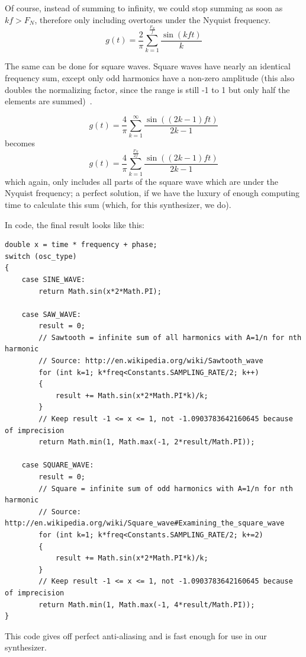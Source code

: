 \documentclass[11pt,a4paper]{article}
\begin{document}
Of course, instead of summing to infinity, we could stop summing as soon as \(kf > F_N\), therefore only including overtones under the Nyquist frequency.
\begin{equation}
g(t) = \frac{2}{\pi}\sum\limits_{k=1}^\frac{F_N}{f}{\frac{\sin(kft)}{k}}
\end{equation}

The same can be done for square waves. Square waves have nearly an identical frequency sum, except only odd harmonics have a non-zero amplitude (this also doubles the normalizing factor, since the range is still -1 to 1 but only half the elements are summed)~\cite{WolframSquare}.

\begin{equation}
g(t) = \frac{4}{\pi}\sum\limits_{k=1}^\infty{\frac{\sin((2k-1)ft)}{2k-1}}
\end{equation}
becomes
\begin{equation}
g(t) = \frac{4}{\pi}\sum\limits_{k=1}^\frac{F_N}{2f}{\frac{\sin((2k-1)ft)}{2k-1}}
\end{equation}
which again, only includes all parts of the square wave which are under the Nyquist frequency; a perfect solution, if we have the luxury of enough computing time to calculate this sum (which, for this synthesizer, we do).

In code, the final result looks like this:
\\\begin{minipage}{\linewidth}
\begin{lstlisting}
double x = time * frequency + phase;
switch (osc_type)
{
	case SINE_WAVE:
		return Math.sin(x*2*Math.PI);
	
	case SAW_WAVE:
		result = 0;
		// Sawtooth = infinite sum of all harmonics with A=1/n for nth harmonic
		// Source: http://en.wikipedia.org/wiki/Sawtooth_wave
		for (int k=1; k*freq<Constants.SAMPLING_RATE/2; k++)
		{
			result += Math.sin(x*2*Math.PI*k)/k;
		}
		// Keep result -1 <= x <= 1, not -1.0903783642160645 because of imprecision
		return Math.min(1, Math.max(-1, 2*result/Math.PI));
		
	case SQUARE_WAVE:
		result = 0;
		// Square = infinite sum of odd harmonics with A=1/n for nth harmonic
		// Source: http://en.wikipedia.org/wiki/Square_wave#Examining_the_square_wave
		for (int k=1; k*freq<Constants.SAMPLING_RATE/2; k+=2)
		{
			result += Math.sin(x*2*Math.PI*k)/k;
		}
		// Keep result -1 <= x <= 1, not -1.0903783642160645 because of imprecision
		return Math.min(1, Math.max(-1, 4*result/Math.PI));
}
\end{lstlisting}
\end{minipage}
This code gives off perfect anti-aliasing and is fast enough for use in our synthesizer.
\end{document}
